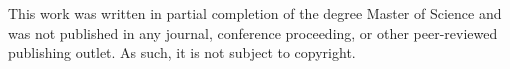 \label{app:copyright}
This work was written in partial completion of the degree Master of Science and was not published in any journal, conference proceeding, or other peer-reviewed publishing outlet. As such, it is not subject to copyright.
